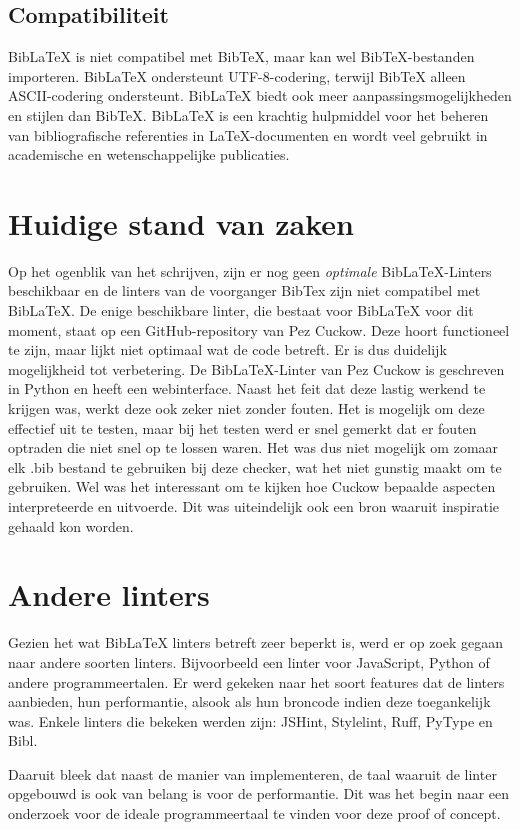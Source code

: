 \subsection{Compatibiliteit}
BibLaTeX is niet compatibel met BibTeX, maar kan wel BibTeX-bestanden importeren. BibLaTeX ondersteunt UTF-8-codering, terwijl BibTeX alleen ASCII-codering ondersteunt. BibLaTeX biedt ook meer aanpassingsmogelijkheden en stijlen dan BibTeX. BibLaTeX is een krachtig hulpmiddel voor het beheren van bibliografische referenties in LaTeX-documenten en wordt veel gebruikt in academische en wetenschappelijke publicaties.

\section{Huidige stand van zaken}
Op het ogenblik van het schrijven, zijn er nog geen \emph{optimale} BibLaTeX-Linters beschikbaar en de linters van de voorganger BibTex zijn niet compatibel met BibLaTeX. De enige beschikbare linter, die bestaat voor BibLaTeX voor dit moment, staat op een GitHub-repository van Pez Cuckow. Deze hoort functioneel te zijn, maar lijkt niet optimaal wat de code betreft. Er is dus duidelijk mogelijkheid tot verbetering. De BibLaTeX-Linter van Pez Cuckow is geschreven in Python en heeft een webinterface.\autocite{Cuckow2022} Naast het feit dat deze lastig werkend te krijgen was, werkt deze ook zeker niet zonder fouten. Het is mogelijk om deze effectief uit te testen, maar bij het testen werd er snel gemerkt dat er fouten optraden die niet snel op te lossen waren. Het was dus niet mogelijk om zomaar elk .bib bestand te gebruiken bij deze checker, wat het niet gunstig maakt om te gebruiken. Wel was het interessant om te kijken hoe Cuckow bepaalde aspecten interpreteerde en uitvoerde. Dit was uiteindelijk ook een bron waaruit inspiratie gehaald kon worden.

\section{Andere linters}
Gezien het wat BibLaTeX linters betreft zeer beperkt is, werd er op zoek gegaan naar andere soorten linters. Bijvoorbeeld een linter voor JavaScript, Python of andere programmeertalen. Er werd gekeken naar het soort features dat de linters aanbieden, hun performantie, alsook als hun broncode indien deze toegankelijk was. Enkele linters die bekeken werden zijn: JSHint, Stylelint, Ruff, PyType en Bibl.

Daaruit bleek dat naast de manier van implementeren, de taal waaruit de linter opgebouwd is ook van belang is voor de performantie. Dit was het begin naar een onderzoek voor de ideale programmeertaal te vinden voor deze proof of concept. 


